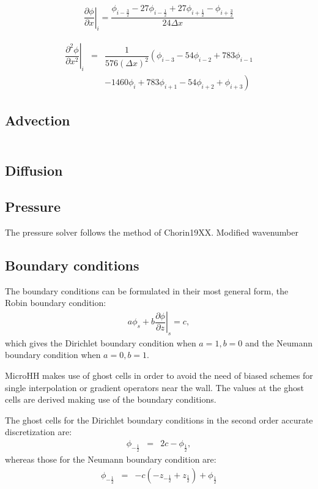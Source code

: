 \documentclass[gmd]{copernicus}
\begin{document}
\begin{eqnarray}
\left. \dfrac{\partial \phi}{\partial x}\right|_i = \dfrac{\phi_{i-\frac{3}{2}} - 27 \phi_{i-\frac{1}{2}} + 27 \phi_{i+\frac{1}{2}} - \phi_{i+\frac{3}{2}}}
             {24 \Delta x}
\end{eqnarray}

\begin{eqnarray}
\nonumber \left. \dfrac{\partial^2 \phi}{\partial x^2}\right|_i & = &
\dfrac{1}{576 \left( \Delta x \right)^2} \left( \phi_{i-3} - 54 \phi_{i-2} + 783 \phi_{i-1}\right.\\
& & \left. - 1460  \phi_i + 783 \phi_{i+1} - 54 \phi_{i+2} + \phi_{i+3} \right)
\end{eqnarray}

\subsection{Advection}
\begin{eqnarray}
\end{eqnarray}

\subsection{Diffusion}


\subsection{Pressure}
The pressure solver follows the method of Chorin19XX.
Modified wavenumber

\subsection{Boundary conditions}
The boundary conditions can be formulated in their most general form, the Robin boundary condition:
\begin{eqnarray}
a \phi_s + b \left.\dfrac{\partial \phi}{\partial z}\right|_s = c,
\end{eqnarray}
which gives the Dirichlet boundary condition when $a = 1, b = 0$ and the Neumann boundary condition when $a = 0, b = 1$. 

MicroHH makes use of ghost cells in order to avoid the need of biased schemes for single interpolation or gradient operators near the wall. The values at the ghost cells are derived making use of the boundary conditions. 

The ghost cells for the Dirichlet boundary conditions in the second order accurate discretization are:
\begin{eqnarray}
\phi_{-\frac{1}{2}} & = & 2 c - \phi_{\frac{1}{2}},
\end{eqnarray}
whereas those for the Neumann boundary condition are:
\begin{eqnarray}
\phi_{-\frac{1}{2}} & = & -c \left( - z_{-\frac{1}{2}} + z_{\frac{1}{2}} \right) + \phi_{\frac{1}{2}}
\end{eqnarray}
\end{document}
